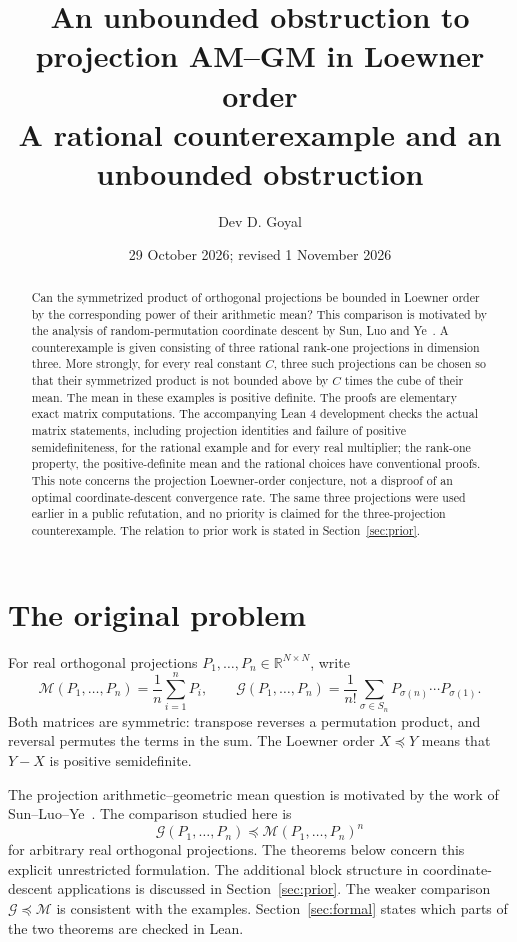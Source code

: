 \documentclass[11pt]{article}
\title{An unbounded obstruction to projection AM--GM in Loewner order\\[4pt]
\large A rational counterexample and an unbounded obstruction}
\author{Dev D. Goyal}
\date{29 October 2026; revised 1 November 2026}
\newcommand{\R}{\mathbb R}
\newcommand{\G}{\mathcal G}
\newcommand{\M}{\mathcal M}
\begin{document}
\maketitle
\begin{abstract}
Can the symmetrized product of orthogonal projections be bounded in Loewner order by the corresponding power of their arithmetic mean? This comparison is motivated by the analysis of random-permutation coordinate descent by Sun, Luo and Ye~\cite{sun}. A counterexample is given consisting of three rational rank-one projections in dimension three. More strongly, for every real constant $C$, three such projections can be chosen so that their symmetrized product is not bounded above by $C$ times the cube of their mean. The mean in these examples is positive definite. The proofs are elementary exact matrix computations. The accompanying Lean 4 development checks the actual matrix statements, including projection identities and failure of positive semidefiniteness, for the rational example and for every real multiplier; the rank-one property, the positive-definite mean and the rational choices have conventional proofs. This note concerns the projection Loewner-order conjecture, not a disproof of an optimal coordinate-descent convergence rate. The same three projections were used earlier in a public refutation, and no priority is claimed for the three-projection counterexample. The relation to prior work is stated in Section~\ref{sec:prior}.
\end{abstract}

\section{The original problem}

For real orthogonal projections $P_1,\ldots,P_n\in\R^{N\times N}$, write
\[
 \M(P_1,\ldots,P_n)=\frac1n\sum_{i=1}^n P_i,
 \qquad
 \G(P_1,\ldots,P_n)=\frac1{n!}\sum_{\sigma\in S_n}
 P_{\sigma(n)}\cdots P_{\sigma(1)}.
\]
Both matrices are symmetric: transpose reverses a permutation product, and reversal permutes the terms in the sum. The Loewner order $X\preceq Y$ means that $Y-X$ is positive semidefinite.

The projection arithmetic--geometric mean question is motivated by the work of Sun--Luo--Ye~\cite{sun}. The comparison studied here is
\begin{equation}\label{eq:conjecture}
 \G(P_1,\ldots,P_n)\preceq\M(P_1,\ldots,P_n)^n
\end{equation}
for arbitrary real orthogonal projections. The theorems below concern this explicit unrestricted formulation. The additional block structure in coordinate-descent applications is discussed in Section~\ref{sec:prior}. The weaker comparison $\G\preceq\M$ is consistent with the examples. Section~\ref{sec:formal} states which parts of the two theorems are checked in Lean.
\end{document}
